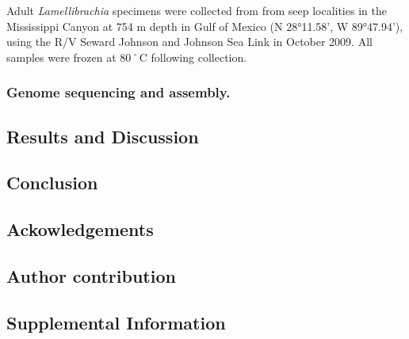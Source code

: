\documentclass[]{article}
\begin{document}
Adult \emph{Lamellibrachia} specimens were collected from from seep
localities in the Mississippi Canyon at 754 m depth in Gulf of Mexico (N
28°11.58', W 89°47.94'), using the R/V Seward Johnson and Johnson Sea
Link in October 2009. All samples were frozen at 80˚C following
collection.

\hypertarget{genome-sequencing-and-assembly.}{%
\subsubsection{Genome sequencing and
assembly.}\label{genome-sequencing-and-assembly.}}

\hypertarget{results-and-discussion}{%
\subsection{Results and Discussion}\label{results-and-discussion}}

\hypertarget{conclusion}{%
\subsection{Conclusion}\label{conclusion}}

\hypertarget{ackowledgements}{%
\subsection{Ackowledgements}\label{ackowledgements}}

\hypertarget{author-contribution}{%
\subsection{Author contribution}\label{author-contribution}}

\pagebreak

\hypertarget{supplemental-information}{%
\subsection{Supplemental Information}\label{supplemental-information}}
\end{document}
